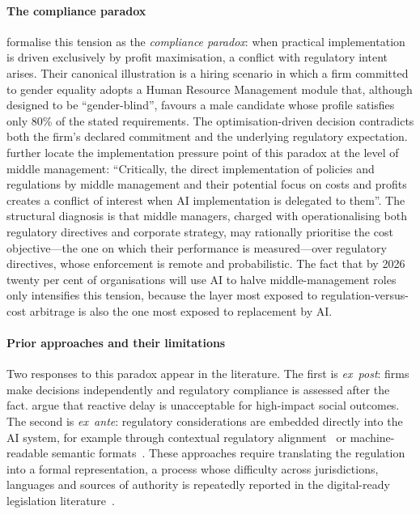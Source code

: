 \documentclass[pdflatex, sn-apa]{sn-jnl}%
\theoremstyle{thmstyleone}%
\theoremstyle{thmstyletwo}%
\theoremstyle{thmstylethree}%
\begin{document}
\paragraph{The compliance paradox}
\citet{sargsyan2025legends} formalise this tension as the \emph{compliance
paradox}: when practical implementation is driven exclusively by profit
maximisation, a conflict with regulatory intent arises. Their canonical
illustration is a hiring scenario in which a firm committed to gender equality
adopts a Human Resource Management module that, although designed to be
``gender-blind'', favours a male candidate whose profile satisfies only 80\% of
the stated requirements. The optimisation-driven decision contradicts both the
firm's declared commitment and the underlying regulatory expectation.
\citet{sargsyan2025legends} further locate the implementation pressure point of
this paradox at the level of middle management: ``Critically, the direct
implementation of policies and regulations by middle management and their
potential focus on costs and profits creates a conflict of interest when AI
implementation is delegated to them''. The structural diagnosis is that middle
managers, charged with operationalising both regulatory directives and corporate
strategy, may rationally prioritise the cost objective---the one on which their
performance is measured---over regulatory directives, whose enforcement is remote
and probabilistic. The fact that by 2026 twenty per cent of organisations will
use AI to halve middle-management roles~\citep{economist2024gartner} only
intensifies this tension, because the layer most exposed to
regulation-versus-cost arbitrage is also the one most exposed to replacement by
AI.

\paragraph{Prior approaches and their limitations}
Two responses to this paradox appear in the literature. The first is
\emph{ex~post}: firms make decisions independently and regulatory compliance is
assessed after the fact. \citet{sargsyan2025legends} argue that reactive delay is
unacceptable for high-impact social outcomes. The second is \emph{ex~ante}:
regulatory considerations are embedded directly into the AI system, for example
through contextual regulatory alignment~\citep{achintalwar2024alignment} or
machine-readable semantic formats~\citep{mclaughlin2021x2rl}. These approaches
require translating the regulation into a formal representation, a process whose
difficulty across jurisdictions, languages and sources of authority is repeatedly
reported in the digital-ready legislation
literature~\citep{motzfeldt2018digital}.
 
\end{document}
